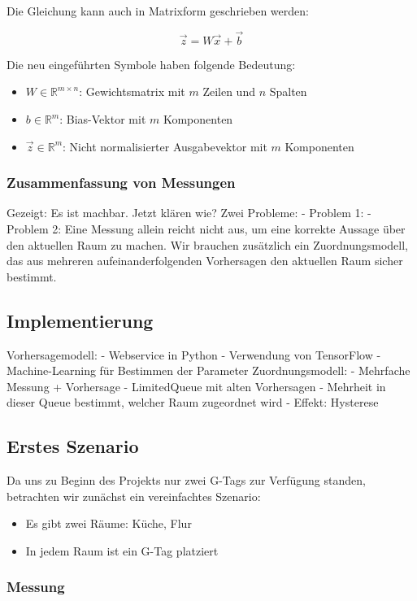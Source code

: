 Die Gleichung kann auch in Matrixform geschrieben werden:

$$ \vec{z} = W \vec{x} + \vec{b} $$

Die neu eingeführten Symbole haben folgende Bedeutung:
\begin{itemize}
	\item $W \in \mathbb{R}^{m \times n}$: Gewichtsmatrix mit $m$ Zeilen und $n$ Spalten
	\item $b \in \mathbb{R}^m$: Bias-Vektor mit $m$ Komponenten
	\item $\vec{z} \in \mathbb{R}^m$: Nicht normalisierter Ausgabevektor mit $m$ Komponenten
\end{itemize}

\subsubsection{Zusammenfassung von Messungen}
Gezeigt: Es ist machbar. Jetzt klären wie?
Zwei Probleme:
- Problem 1: 
- Problem 2: Eine Messung allein reicht nicht aus, um eine korrekte Aussage über
  den aktuellen Raum zu machen. Wir brauchen zusätzlich ein Zuordnungsmodell,
  das aus mehreren aufeinanderfolgenden Vorhersagen den aktuellen Raum sicher
  bestimmt.
  
\subsection{Implementierung}

Vorhersagemodell:
- Webservice in Python
- Verwendung von TensorFlow
- Machine-Learning für Bestimmen der Parameter
Zuordnungsmodell:
- Mehrfache Messung + Vorhersage
- LimitedQueue mit alten Vorhersagen
- Mehrheit in dieser Queue bestimmt, welcher Raum zugeordnet wird
- Effekt: Hysterese

\subsection{Erstes Szenario}

Da uns zu Beginn des Projekts nur zwei G-Tags zur Verfügung standen, betrachten
wir zunächst ein vereinfachtes Szenario:
\begin{itemize}
	\item Es gibt zwei Räume: Küche, Flur
	\item In jedem Raum ist ein G-Tag platziert
\end{itemize}

\subsubsection{Messung}

